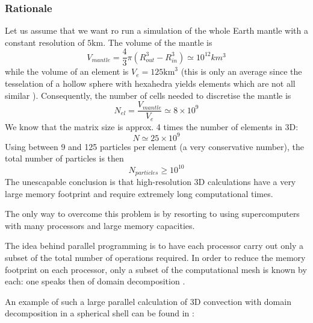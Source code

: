 
\subsubsection{Rationale}

Let us assume that we want ro run a simulation of the whole Earth mantle
with a constant resolution of $5\text{km}$. The volume of the mantle is
\[
V_{mantle}=\frac{4}{3}\pi (R_{out}^3-R_{in}^3) \simeq  10^{12}  km^3
\]
while the volume of an element is $V_{e} = 125 \text{km}^3$ (this is 
only an average since the tesselation of a hollow sphere with 
hexahedra yields elements which are not all similar \cite{thie18}).
Consequently, the number of cells needed to discretise the mantle
is 
\[
N_{el}=\frac{V_{mantle}}{V_{e}}\simeq 8\times 10^9
\]
We know that the matrix size is approx. 4 times the number of elements in 3D:
\[
N\simeq 25 \times 10^9
\]
Using between 9 and 125 particles per element (a very conservative number),
the total number of particles is then
\[
N_{particles}  \geq 10^{10}
\]
The unescapable conclusion is that high-resolution 3D 
calculations 
 have a very large memory footprint and require extremely long computational times.

The only way to overcome this problem is by resorting to 
using supercomputers with many processors and large memory capacities.

The idea behind parallel programming is to have each processor carry out 
only a subset of the total number of operations required. In order to reduce 
the memory footprint on each processor, only a subset of the computational
mesh is known by each: one speaks then of domain decomposition \cite{towi}.

An example of such a large parallel calculation of 3D convection with 
domain decomposition in a spherical shell can be found in \cite{krhb12}:

